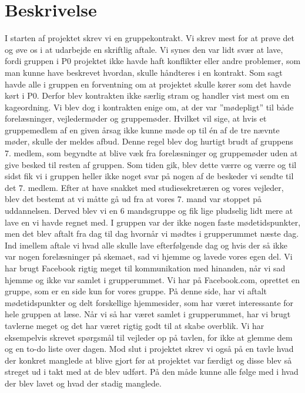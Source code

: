 \section{Beskrivelse}
I starten af projektet skrev vi en gruppekontrakt. Vi skrev mest for at prøve det og øve os i at udarbejde en skriftlig aftale. Vi synes den var lidt svær at lave, fordi gruppen i P0 projektet ikke havde haft konflikter eller andre problemer, som man kunne have beskrevet hvordan, skulle håndteres i en kontrakt. Som sagt havde alle i gruppen en forventning om at projektet skulle kører som det havde kørt i P0. Derfor blev kontrakten ikke særlig stram og handler vist mest om en kageordning. Vi blev dog i kontrakten enige om, at der var ”mødepligt” til både forelæsninger, vejledermøder og gruppemøder. Hvilket vil sige, at hvis et gruppemedlem af en given årsag ikke kunne møde op til én af de tre nævnte møder, skulle der meldes afbud. Denne regel blev dog hurtigt brudt af gruppens 7. medlem, som begyndte at blive væk fra forelæsninger og gruppemøder uden at give besked til resten af gruppen. Som tiden gik, blev dette værre og værre og til sidst fik vi i gruppen heller ikke noget svar på nogen af de beskeder vi sendte til det 7. medlem. Efter at have snakket med studiesekretæren og vores vejleder, blev det bestemt at vi måtte gå ud fra at vores 7. mand var stoppet på uddannelsen. Derved blev vi en 6 mandsgruppe og fik lige pludselig lidt mere at lave en vi havde regnet med.
I gruppen var der ikke nogen faste mødetidspunkter, men det blev aftalt fra dag til dag hvornår vi mødtes i grupperummet næste dag. Ind imellem aftale vi hvad alle skulle lave efterfølgende dag og hvis der så ikke var nogen forelæsninger på skemaet, sad vi hjemme og lavede vores egen del. 
Vi har brugt Facebook rigtig meget til kommunikation med hinanden, når vi sad hjemme og ikke var samlet i grupperummet. Vi har på Facebook.com, oprettet en gruppe, som er en side kun for vores gruppe. På denne side, har vi aftalt mødetidspunkter og delt forskellige hjemmesider, som har været interessante for hele gruppen at læse. Når vi så har været samlet i grupperummet, har vi brugt tavlerne meget og det har været rigtig godt til at skabe overblik. Vi har eksempelvis skrevet spørgsmål til vejleder op på tavlen, for ikke at glemme dem og en to-do liste over dagen. Mod slut i projektet skrev vi også på en tavle hvad der konkret manglede at blive gjort før at projektet var færdigt og disse blev så streget ud i takt med at de blev udført. På den måde kunne alle følge med i hvad der blev lavet og hvad der stadig manglede. 

